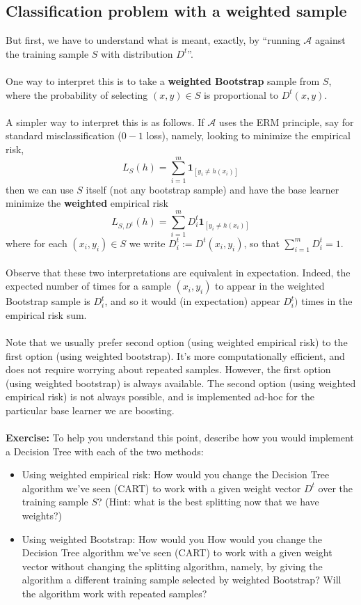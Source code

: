 \documentclass[11pt]{article}
\newcommand{\Ac}{\mathcal{A}}
\begin{document}
\subsection{Classification problem with a weighted sample}

But first, we have to understand  what is meant, exactly,  by ``running $\Ac$
against the training sample $S$ with distribution $D^t$''.  
\\~\\
One way to interpret this is to take a {\bf weighted Bootstrap} sample from $S$,
where the probability of selecting $(x,y)\in S$ is proportional to $D^t(x,y)$. 
\\~\\
A simpler way to interpret this is as follows. If $\Ac$ uses the ERM principle,
say for standard misclassification ($0-1$ loss),
namely, looking to minimize the empirical risk,
\[
  L_S(h) = \sum_{i=1}^m \mathbf{1}_{[y_i \neq h(x_i)]} 
\]
then we can use $S$ itself (not
any bootstrap sample) and have the base learner 
minimize the {\bf weighted} empirical risk
\[
  L_{S,D^t}(h) = \sum_{i=1}^m D^t_i\mathbf{1}_{[y_i \neq h(x_i)]} 
\]
where for each $(x_i,y_i)\in S$ we write $D^t_i := D^t(x_i,y_i)$, so that  
$\sum_{i=1}^m D^t_i =1$.
\\~\\
Observe that these two interpretations are equivalent in expectation. Indeed,
the expected number of times for a sample $(x_i,y_i)$ to appear in the weighted
Bootstrap sample is $D^t_i$, and so it would (in expectation) appear $D^t_i)$
times in the empirical risk sum. 
\\~\\
Note that we usually prefer second option (using weighted empirical risk) to the
first option (using weighted bootstrap). 
It's more computationally efficient, and does not require worrying about
repeated samples.
However, the first option (using weighted bootstrap) is always available. The
second option (using weighted empirical risk) is not always possible, and is
implemented ad-hoc for the particular base learner we are boosting.
\\~\\
{\bf Exercise:}
To help you understand this point, describe how you would implement a Decision
Tree with each of the two methods:
\begin{itemize}
  \item Using weighted empirical risk: How would you change the Decision Tree
    algorithm we've seen (CART) to work with a given weight vector $D^t$ over
    the training sample $S$? (Hint: what is the best splitting now that we have
    weights?)
  \item Using weighted Bootstrap: How would you How would you change the Decision Tree
    algorithm we've seen (CART)  to work with a given weight vector without
    changing the splitting algorithm, namely, by giving the algorithm a
    different training sample selected by weighted Bootstrap? Will the algorithm
    work with repeated samples?
\end{itemize}
\end{document}

